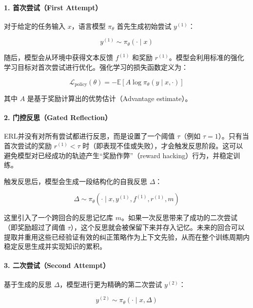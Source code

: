 \hypertarget{ux9996ux6b21ux5c1dux8bd5first-attempt}{%
\paragraph{1. 首次尝试（First Attempt）}\label{ux9996ux6b21ux5c1dux8bd5first-attempt}}

对于给定的任务输入 \(x\)，语言模型 \(\pi_\theta\) 首先生成初始尝试 \(y^{(1)}\)：

\[
y^{(1)}\sim\pi_\theta(\cdot\mid x)
\]

随后，模型会从环境中获得文本反馈 \(f^{(1)}\) 和奖励 \(r^{(1)}\)。模型会利用标准的强化学习目标对首次尝试进行优化。强化学习的损失函数定义为：

\[
\mathcal{L}_{\mathrm{policy}}(\theta)=-\mathbb{E}\left[A\log\pi_\theta(y\mid x,\cdot)\right]
\]

其中 \(A\) 是基于奖励计算出的优势估计（Advantage estimate）。

\hypertarget{ux95e8ux63a7ux53cdux601dgated-reflection}{%
\paragraph{2. 门控反思（Gated Reflection）}\label{ux95e8ux63a7ux53cdux601dgated-reflection}}

ERL并没有对所有尝试都进行反思，而是设置了一个阈值 \(\tau\)（例如 \(\tau=1\)）。只有当首次尝试的奖励 \(r^{(1)}\lt\tau\) 时（即表现不佳或失败），才会触发反思阶段。这可以避免模型对已经成功的轨迹产生``奖励作弊''（reward hacking）行为，并稳定训练。

触发反思后，模型会生成一段结构化的自我反思 \(\Delta\)：

\[
\Delta\sim\pi_\theta(\cdot\mid x,y^{(1)},f^{(1)},r^{(1)},m)
\]

这里引入了一个跨回合的反思记忆库 \(m\)。如果一次反思带来了成功的二次尝试（即奖励超过了阈值 \(\tau\)），这个反思就会被保留下来并存入记忆。未来的回合可以提取并重用这些已经验证有效的纠正策略作为上下文先验，从而在整个训练周期内稳定反思生成并实现知识的累积。

\hypertarget{ux4e8cux6b21ux5c1dux8bd5second-attempt}{%
\paragraph{3. 二次尝试（Second Attempt）}\label{ux4e8cux6b21ux5c1dux8bd5second-attempt}}

基于生成的反思 \(\Delta\)，模型进行更为精确的第二次尝试 \(y^{(2)}\)：

\[
y^{(2)}\sim\pi_\theta(\cdot\mid x,\Delta)
\]

